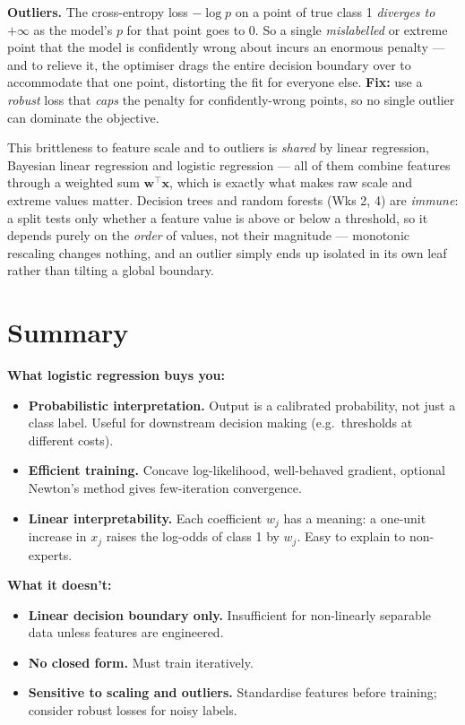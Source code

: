 \documentclass[11pt, a4paper]{article}
\begin{document}
\textbf{Outliers.} The cross-entropy loss $-\log p$ on a point of true class 1 \emph{diverges to $+\infty$} as the model's $p$ for that point goes to $0$. So a single \emph{mislabelled} or extreme point that the model is confidently wrong about incurs an enormous penalty --- and to relieve it, the optimiser drags the entire decision boundary over to accommodate that one point, distorting the fit for everyone else.
\textbf{Fix:} use a \emph{robust} loss that \emph{caps} the penalty for confidently-wrong points, so no single outlier can dominate the objective.

\begin{notebox}
This brittleness to feature scale and to outliers is \emph{shared} by linear regression, Bayesian linear regression and logistic regression --- all of them combine features through a weighted sum $\mathbf{w}^\top\mathbf{x}$, which is exactly what makes raw scale and extreme values matter. Decision trees and random forests (Wks 2, 4) are \emph{immune}: a split tests only whether a feature value is above or below a threshold, so it depends purely on the \emph{order} of values, not their magnitude --- monotonic rescaling changes nothing, and an outlier simply ends up isolated in its own leaf rather than tilting a global boundary.
\end{notebox}

\section{Summary}

\textbf{What logistic regression buys you:}
\begin{itemize}
  \item \textbf{Probabilistic interpretation.} Output is a calibrated probability, not just a class label. Useful for downstream decision making (e.g.\ thresholds at different costs).
  \item \textbf{Efficient training.} Concave log-likelihood, well-behaved gradient, optional Newton's method gives few-iteration convergence.
  \item \textbf{Linear interpretability.} Each coefficient $w_j$ has a meaning: a one-unit increase in $x_j$ raises the log-odds of class 1 by $w_j$. Easy to explain to non-experts.
\end{itemize}

\textbf{What it doesn't:}
\begin{itemize}
  \item \textbf{Linear decision boundary only.} Insufficient for non-linearly separable data unless features are engineered.
  \item \textbf{No closed form.} Must train iteratively.
  \item \textbf{Sensitive to scaling and outliers.} Standardise features before training; consider robust losses for noisy labels.
\end{itemize}
\end{document}
